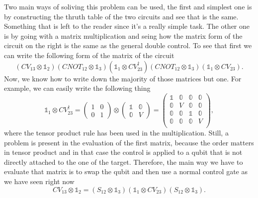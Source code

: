 {
    Two main ways of soliving this problem can be used, the first and simplest one is by constructing the thruth table of the two circuits and see that is the same. Something that is left to the reader since it's a really simple task. The other one is by going with a matrix multiplication and seing how the matrix form of the circuit on the right is the same as the general double control. To see that first we can write the following form of the matrix of the circuit
    \begin{equation}
        \left( CV_{13}\otimes\mathbb{1}_2 \right)\left( CNOT_{12}\otimes \mathbb{1}_3 \right)\left( \mathbb{1}_1\otimes CV^\dagger_{23} \right)\left( CNOT_{12}\otimes \mathbb{1}_3 \right)\left( \mathbb{1}_1 \otimes CV_{23} \right).
    \end{equation}
    Now, we know how to write down the majority of those matrices but one. For example, we can easily write the following thing
    \begin{equation}
        \mathbb{1}_1\otimes CV^\dagger_{23} = \begin{pmatrix}
            1 & 0\\
            0 & 1
        \end{pmatrix}\otimes\begin{pmatrix}
            \mathbb{1} & \mathbb{0}\\
            \mathbb{0} & V
        \end{pmatrix} = \begin{pmatrix}
            \mathbb{1} & \mathbb{0} & \mathbb{0} & \mathbb{0}\\
            \mathbb{0} & V & \mathbb{0} & \mathbb{0}\\
            \mathbb{0} & \mathbb{0} & \mathbb{1} & \mathbb{0}\\
            \mathbb{0} & \mathbb{0} & \mathbb{0} & V\\
        \end{pmatrix},
    \end{equation}
    where the tensor product rule has been used in the multiplication. Still, a problem is present in the evaluation of the first matrix, because the order matters in tensor product and in that case the control is applied to a qubit that is not directly attached to the one of the target. Therefore, the main way we have to evaluate that matrix is to swap the qubit and then use a normal control gate as we have seen right now
    \begin{equation}
        CV_{13}\otimes\mathbb{1}_2 = \left( S_{12}\otimes\mathbb{1}_3 \right)\left( \mathbb{1}_1 \otimes CV_{23} \right)\left( S_{12}\otimes\mathbb{1}_3 \right).

\end{equation}}
